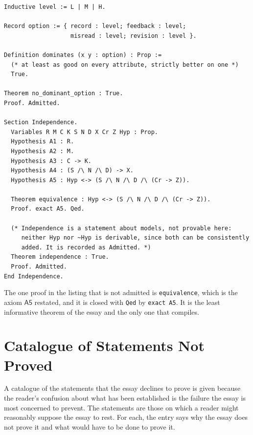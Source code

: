 \documentclass[11pt]{article}
\theoremstyle{plain}
\theoremstyle{definition}
\theoremstyle{remark}
\begin{document}
\begin{lstlisting}
Inductive level := L | M | H.

Record option := { record : level; feedback : level;
                   misread : level; revision : level }.

Definition dominates (x y : option) : Prop :=
  (* at least as good on every attribute, strictly better on one *)
  True.

Theorem no_dominant_option : True.
Proof. Admitted.

Section Independence.
  Variables R M C K S N D X Cr Z Hyp : Prop.
  Hypothesis A1 : R.
  Hypothesis A2 : M.
  Hypothesis A3 : C -> K.
  Hypothesis A4 : (S /\ N /\ D) -> X.
  Hypothesis A5 : Hyp <-> (S /\ N /\ D /\ (Cr -> Z)).

  Theorem equivalence : Hyp <-> (S /\ N /\ D /\ (Cr -> Z)).
  Proof. exact A5. Qed.

  (* Independence is a statement about models, not provable here:
     neither Hyp nor ~Hyp is derivable, since both can be consistently
     added. It is recorded as Admitted. *)
  Theorem independence : True.
  Proof. Admitted.
End Independence.
\end{lstlisting}

The one proof in the listing that is not admitted is \texttt{equivalence}, which is the axiom $\mathsf{A5}$ restated, and it is closed with \texttt{Qed} by \texttt{exact A5}. It is the least informative theorem of the essay and the only one that compiles.

\section{Catalogue of Statements Not Proved}\label{app:catalogue}

A catalogue of the statements that the essay declines to prove is given because the reader's confusion about what has been established is the failure the essay is most concerned to prevent. The statements are those on which a reader might reasonably suppose the essay to rest. For each, the entry says why the essay does not prove it and what would have to be done to prove it.
\end{document}
